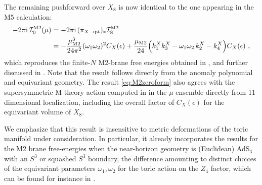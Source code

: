 \documentclass[11pt,a4paper]{article}
\def\cI{{\cal I}}
\def\i{{\rm i}}
\theoremstyle{definition}
\theoremstyle{identity}
\theoremstyle{remark}
\newcommand{\be}{\begin{equation}}
\newcommand{\ee}{\end{equation}}
\newcommand{\e}{\epsilon}
\begin{document}
The remaining pushforward over $X_8$ is now identical to the one appearing in the M5
calculation:
\be
\label{eq:M2zeroform}
\begin{split}
-2\pi \i\, \cI_0^{\rm M2}(\mu)
&=-2\pi \i\, 
(\pi_{X\rightarrow{\rm pt}})_*\cI_8^{\rm M2}
\\
&=-
\frac{\mu_\text{M2}^3}{24 \pi^2}(\omega_1\omega_2)^2 C_X(\e)
+
\frac{\mu_\text{M2}}{24}
\Big(
k_1^X k_3^X
-\omega_1\omega_2\,k_2^X
-k_4^X
\Big)C_X(\e)\ ,
\end{split}
\ee
which reproduces the finite-$N$ M2-brane free energies obtained in
\cite{Cassia:2025jkr}, and further discussed in \cite{Hristov:2026tde}. Note that the result follows directly from the anomaly polynomial and equivariant geometry. The result \eqref{eq:M2zeroform} also agrees with the supersymmetric M-theory action computed in \cite{BenettiGenolini:2026cyc} in the $\mu$ ensemble directly from 11-dimensional localization, including the overall factor of $C_X(\epsilon)$ for the equivariant volume of $X_8$.

We emphasize that this result is insensitive to metric deformations of the toric manifold under consideration. In particular, it already incorporates the results for the M2 brane free-energies when the near-horizon geometry is (Euclidean) AdS$_4$ with an $S^3$ or squashed $S^3$ boundary, the difference amounting to distinct choices of the equivariant parameters $\omega_1,\omega_2$ for the toric action on the $Z_4$ factor, which can be found for instance in \cite{Cassia:2025jkr}.
\end{document}
